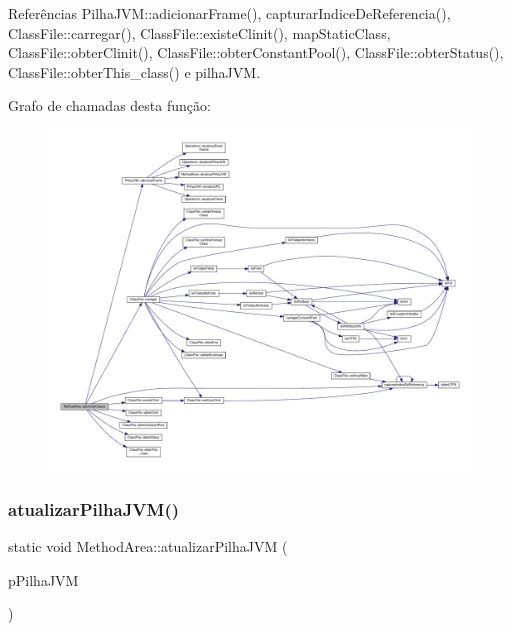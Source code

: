 Referências Pilha\+J\+V\+M\+::adicionar\+Frame(), capturar\+Indice\+De\+Referencia(), Class\+File\+::carregar(), Class\+File\+::existe\+Clinit(), map\+Static\+Class, Class\+File\+::obter\+Clinit(), Class\+File\+::obter\+Constant\+Pool(), Class\+File\+::obter\+Status(), Class\+File\+::obter\+This\+\_\+class() e pilha\+J\+VM.

Grafo de chamadas desta função\+:
\nopagebreak
\begin{figure}[H]
\begin{center}
\leavevmode
\includegraphics[width=350pt]{classMethodArea_ac2a5ab0e6b36c9af7062f145218b4cf0_cgraph}
\end{center}
\end{figure}
\mbox{\label{classMethodArea_a6ee32cdf91b461ff3c8a278b5d0cd126}} 
\subsubsection{\texorpdfstring{atualizar\+Pilha\+J\+V\+M()}{atualizarPilhaJVM()}}
{\footnotesize\ttfamily static void Method\+Area\+::atualizar\+Pilha\+J\+VM (\begin{DoxyParamCaption}\item[{\hyperlink{classPilhaJVM}{Pilha\+J\+VM} $\ast$}]{p\+Pilha\+J\+VM }\end{DoxyParamCaption})\hspace{0.3cm}{\ttfamily [static]}}



